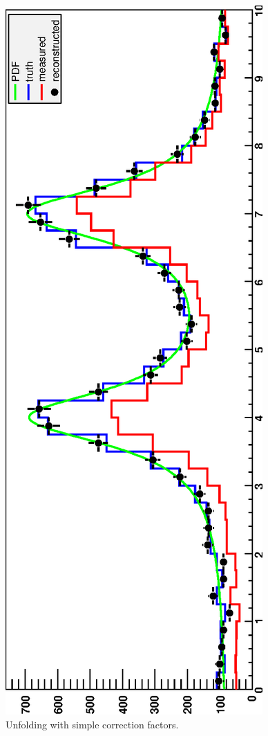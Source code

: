 \documentclass{desyproc}
\begin{document}
\begin{figure}[hb]
\centerline{\includegraphics[angle=-90,width=\textwidth]{adye_tim.bin2.eps}}
\caption{Unfolding with simple correction factors.}\label{Fig:adye:bin-example}
\end{figure}
\end{document}
